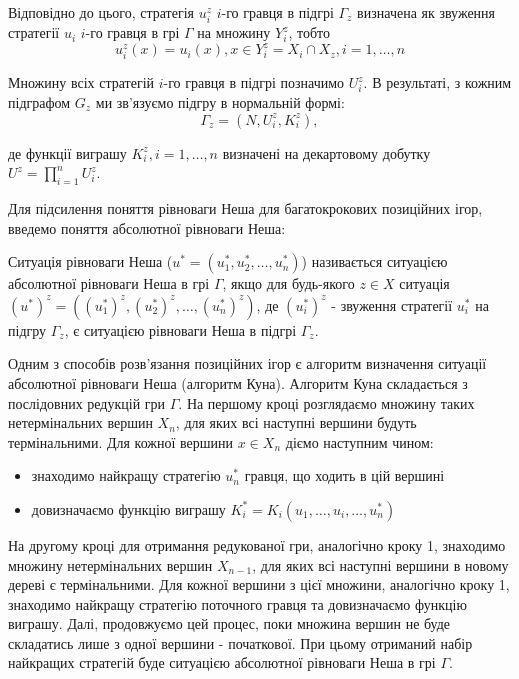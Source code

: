 \documentclass[12pt,a4paper]{article}
\begin{document}
Відповідно до цього, стратегія $u_i^z$ $i$-го гравця в підгрі $\Gamma_z$
визначена як звуження стратегії $u_i$ $i$-го гравця в грі $\Gamma$ на множину
$Y_i^z$, тобто
\begin{equation*}
  u_i^z(x)=u_i(x), x \in Y_i^z=X_i \cap X_z, i=1,\dots,n
\end{equation*}

Множину всіх стратегій $i$-го гравця в підгрі позначимо $U_i^z$. В результаті,
з кожним підграфом $G_z$ ми зв'язуємо підгру в нормальній формі:
\begin{equation*}
  \Gamma_z=(N, {{U_i^z}}, {{K_i^z}}),
\end{equation*}

де функції виграшу $K_i^z, i=1,\dots,n$ визначені на декартовому добутку
$U^z=\displaystyle\prod_{i=1}^nU_i^z$.

Для підсилення поняття рівноваги Неша для багатокрокових позиційних ігор,
введемо поняття абсолютної рівноваги Неша:

Ситуація рівноваги Неша ($u^*=(u_1^*,u_2^*,\dots,u_n^*)$) називається
ситуацією абсолютної рівноваги Неша в грі $\Gamma$, якщо для будь-якого $z
\in X$ ситуація $(u^*)^z=((u_1^*)^z,(u_2^*)^z,\dots,(u_n^*)^z)$, де
$(u_i^*)^z$ - звуження стратегії $u_i^*$ на підгру $\Gamma_z$, є ситуацією
рівноваги Неша в підгрі $\Gamma_z$.

Одним з способів розв'язання позиційних ігор є алгоритм визначення ситуації
абсолютної рівноваги Неша (алгоритм Куна). Алгоритм Куна складається з
послідовних редукцій гри $\Gamma$. На першому кроці розглядаємо множину таких
нетермінальних вершин $X_n$, для яких всі наступні вершини будуть
термінальними. Для кожної вершини $x \in X_n$ діємо наступним чином:
\begin{itemize}
\item знаходимо найкращу стратегію $u_n^*$ гравця, що ходить в цій вершині
\item довизначаємо функцію виграшу $K_i^*=K_i(u_1,\dots,u_i,\dots,u_n^*)$
\end{itemize}

На другому кроці для отримання редукованої гри, аналогічно кроку 1, знаходимо
множину нетермінальних вершин $X_{n-1}$, для яких всі наступні вершини в
новому дереві є термінальними. Для кожної вершини з цієї множини, аналогічно
кроку 1, знаходимо найкращу стратегію поточного гравця та довизначаємо функцію
виграшу. Далі, продовжуємо цей процес, поки множина вершин не буде складатись
лише з одної вершини - початкової. При цьому отриманий набір найкращих
стратегій буде ситуацією абсолютної рівноваги Неша в грі $\Gamma$.
\end{document}
